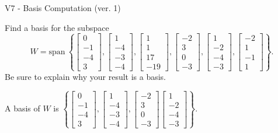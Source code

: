 \begin{exercise}
  \begin{exerciseTitle}V7 - Basis Computation (ver. 1)\end{exerciseTitle}
  \begin{exerciseStatement}
    Find a basis for the subspace 
\[W=\mathrm{span}\ \left\{\left[\begin{array}{r}
0 \\
-1 \\
-4 \\
3
\end{array}\right] , \left[\begin{array}{r}
1 \\
-4 \\
-3 \\
-4
\end{array}\right] , \left[\begin{array}{r}
1 \\
1 \\
17 \\
-19
\end{array}\right] , \left[\begin{array}{r}
-2 \\
3 \\
0 \\
-3
\end{array}\right] , \left[\begin{array}{r}
1 \\
-2 \\
-4 \\
-3
\end{array}\right] , \left[\begin{array}{r}
-2 \\
1 \\
-1 \\
1
\end{array}\right]\right\}.\]
 Be sure to explain why your result is a basis.


  \end{exerciseStatement}
  \begin{exerciseAnswer}
   A basis of \(W\) is  \(\left\{\left[\begin{array}{r}
0 \\
-1 \\
-4 \\
3
\end{array}\right] , \left[\begin{array}{r}
1 \\
-4 \\
-3 \\
-4
\end{array}\right] , \left[\begin{array}{r}
-2 \\
3 \\
0 \\
-3
\end{array}\right] \left[\begin{array}{r}
1 \\
-2 \\
-4 \\
-3
\end{array}\right]\right\}\).
  


  \end{exerciseAnswer}
\end{exercise}
